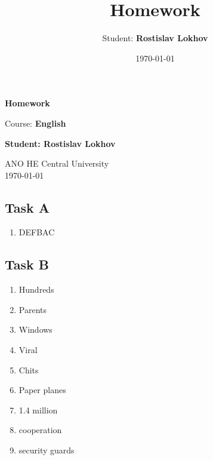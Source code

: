 \documentclass[a4paper,12pt,english]{article}
\title{Homework}
\author{Student: \textbf{Rostislav Lokhov}}
\date{\today}
\begin{document}
\begin{titlepage}
    \centering
    \vspace*{1cm}

    \Huge
    \textbf{Homework}

    \vspace{0.5cm}
    \LARGE
    Course: \textbf{English}

    \vspace{1.5cm}

    \textbf{Student: Rostislav Lokhov}

    \vfill

    \Large
    ANO HE Central University\\
    \vspace{0.3cm}
    \today

\end{titlepage}


\subsection{Task A}
\begin{enumerate}
    \item DEFBAC
\end{enumerate}

\subsection{Task B}
\begin{enumerate}
    \item Hundreds
    \item Parents
    \item Windows
    \item Viral
    \item Chits
    \item Paper planes
    \item 1.4 million
    \item cooperation
    \item security guards
\end{enumerate}
\end{document}
